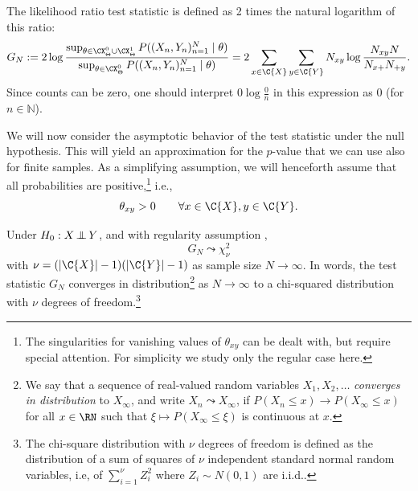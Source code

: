 The likelihood ratio test statistic is defined as 2 times the natural logarithm of this ratio:
\begin{equation}\label{eq:G_test_statistic}
  G_N := 2 \log \frac{\sup_{\theta\in\CX_\Theta^0\cup\CX_\Theta^1} P((X_n,Y_n)_{n=1}^N \mid \theta)}{\sup_{\theta\in\CX_\Theta^0} P((X_n,Y_n)_{n=1}^N \mid \theta)} = 2 \sum_{x\in\C{X}} \sum_{y\in\C{Y}} N_{xy} \log \frac{N_{xy} N}{N_{x+} N_{+ y}}.
\end{equation}
Since counts can be zero, one should interpret $0 \log \frac{0}{n}$ in this expression as $0$ (for $n \in \mathbb{N}$).

We will now consider the asymptotic behavior of the test statistic under the null hypothesis.
This will yield an approximation for the $p$-value that we can use also for finite samples.
As a simplifying assumption, we will henceforth assume that all probabilities are positive,\footnote{The singularities for vanishing values of $\theta_{xy}$ can be dealt with, but require special attention. For simplicity we study only the regular case here.} i.e.,
\begin{equation}\label{eq:G_test_regularity}
  \theta_{xy} > 0 \qquad \forall x \in \C{X}, y\in \C{Y}.
\end{equation}
\begin{Prp}\label{prp:G_test_asymptotics_H0}
Under $H_0 : X \operatorname*{\perp\mkern-11mu\perp} Y$, and with regularity assumption ,
$$G_N \leadsto \chi_\nu^2$$
with $\nu = (|\C{X}| - 1)(|\C{Y}| - 1)$ as sample size $N \to \infty$.
  In words, the test statistic $G_N$ converges in distribution\footnote{We say that a sequence of real-valued random variables $X_1,X_2,\dots$ \emph{converges in distribution} to $X_\infty$, and write $X_n \leadsto X_\infty$, if $P(X_n \le x) \to P(X_\infty \le x)$ for all $x \in \RN$ such that $\xi \mapsto P(X_\infty \le \xi)$ is continuous at $x$.} as $N \to \infty$ to a chi-squared distribution with $\nu$ degrees of freedom.\footnote{The chi-square distribution with $\nu$ degrees of freedom is defined as the distribution of a sum of squares of $\nu$ independent standard normal random variables, i.e, of $\sum_{i=1}^\nu Z_i^2$ where $Z_i \sim N(0,1)$ are i.i.d..}
\end{Prp}
